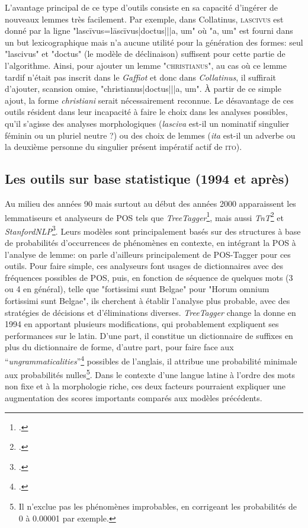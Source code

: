 L'avantage principal de ce type d'outils consiste en sa capacité d'ingérer de nouveaux lemmes très facilement. Par exemple, dans Collatinus, \textsc{lascivus} est donné par la ligne "lascīvus=lāscīvus|doctus|||a, um" où "a, um" est fourni dans un but lexicographique mais n'a aucune utilité pour la génération des formes: seul "lascivus" et "doctus" (le modèle de déclinaison) suffisent pour cette partie de l'algorithme. Ainsi, pour ajouter un lemme "\textsc{christianus}", au cas où ce lemme tardif n'était pas inscrit dans le \textit{Gaffiot} et donc dans \textit{Collatinus}, il suffirait d'ajouter, scansion omise, "christianus|doctus|||a, um". À partir de ce simple ajout, la forme \textit{christiani} serait nécessairement reconnue. Le désavantage de ces outils résident dans leur incapacité à faire le choix dans les analyses possibles, qu'il s'agisse des analyses morphologiques (\textit{lasciva} est-il un nominatif singulier féminin ou un pluriel neutre ?) ou des choix de lemmes (\textit{ita} est-il un adverbe ou la deuxième personne du singulier présent impératif actif de \textsc{ito}).

\subsection{Les outils sur base statistique (1994 et après)}

Au milieu des années 90 mais surtout au début des années 2000 apparaissent les lemmatiseurs et analyseurs de POS tels que \textit{TreeTagger}\footcite{schmid1994treetagger}, mais aussi \textit{TnT}\footcite{brants_tnt_2000} et \textit{StanfordNLP}\footcite{toutanova_feature-rich_2003}. Leurs modèles sont principalement basés sur des structures à base de probabilités d'occurrences de phénomènes en contexte, en intégrant la POS à l'analyse de lemme: on parle d'ailleurs principalement de POS-Tagger pour ces outils. Pour faire simple, ces analyseurs font usages de dictionnaires avec des fréquences possibles de POS, puis, en fonction de séquence de quelques mots (3 ou 4 en général), telle que "fortissimi sunt Belgae" pour "Horum omnium fortissimi sunt Belgae", ils cherchent à établir l'analyse plus probable, avec des stratégies de décisions et d'éliminations diverses. \textit{TreeTagger} change la donne en 1994 en apportant plusieurs modifications, qui probablement expliquent ses performances sur le latin. D'une part, il constitue un dictionnaire de suffixes en plus du dictionnaire de forme, d'autre part, pour faire face aux \enquote{\textit{ungrammaticalities}}\footcite[p.~2]{schmid1994treetagger} possibles de l'anglais, il attribue une probabilité minimale aux probabilités nulles\footnote{Il n'exclue pas les phénomènes improbables, en corrigeant les probabilités de 0 à 0.00001 par exemple.}. Dans le contexte d'une langue latine à l'ordre des mots non fixe et à la morphologie riche, ces deux facteurs pourraient expliquer une augmentation des scores importants comparés aux modèles précédents.

